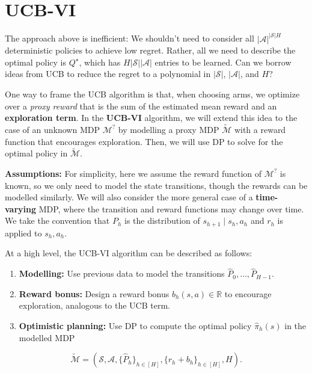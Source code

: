 \documentclass[
  letterpaper,
  DIV=11,
  numbers=noendperiod]{scrreprt}
\theoremstyle{plain}
\theoremstyle{plain}
\theoremstyle{definition}
\theoremstyle{definition}
\theoremstyle{remark}
\begin{document}
\section{UCB-VI}\label{ucb-vi}

The approach above is inefficient: We shouldn't need to consider all
\(|\mathcal{A}|^{|\mathcal{S}| H}\) deterministic policies to achieve
low regret. Rather, all we need to describe the optimal policy is
\(Q^\star\), which has \(H |\mathcal{S}||\mathcal{A}|\) entries to be
learned. Can we borrow ideas from UCB to reduce the regret to a
polynomial in \(|\mathcal{S}|\), \(|\mathcal{A}|\), and \(H\)?

One way to frame the UCB algorithm is that, when choosing arms, we
optimize over a \emph{proxy reward} that is the sum of the estimated
mean reward and an \textbf{exploration term}. In the \textbf{UCB-VI}
algorithm, we will extend this idea to the case of an unknown MDP
\(\mathcal{M}^{?}\) by modelling a proxy MDP \(\widetilde{\mathcal{M}}\)
with a reward function that encourages exploration. Then, we will use DP
to solve for the optimal policy in \(\widetilde{\mathcal{M}}\).

\textbf{Assumptions:} For simplicity, here we assume the reward function
of \(\mathcal{M}^{?}\) is known, so we only need to model the state
transitions, though the rewards can be modelled similarly. We will also
consider the more general case of a \textbf{time-varying} MDP, where the
transition and reward functions may change over time. We take the
convention that \(P_h\) is the distribution of
\(s_{h+1} \mid s_{h}, a_{h}\) and \(r_h\) is applied to \(s_h, a_h\).

At a high level, the UCB-VI algorithm can be described as follows:

\begin{enumerate}
\def\labelenumi{\arabic{enumi}.}
\item
  \textbf{Modelling:} Use previous data to model the transitions
  \(\widehat{P}_0, \dots, \widehat{P}_{H-1}\).
\item
  \textbf{Reward bonus:} Design a reward bonus
  \(b_h(s, a) \in \mathbb{R}\) to encourage exploration, analogous to
  the UCB term.
\item
  \textbf{Optimistic planning:} Use DP to compute the optimal policy
  \(\widehat \pi_h(s)\) in the modelled MDP
\end{enumerate}

\[\tilde{\mathcal{M}} = (\mathcal{S}, \mathcal{A}, \{ \widehat{P}_h\}_{h \in [H]}, \{ r_h+ b_h\}_{h \in [H]}, H).\]
\end{document}
